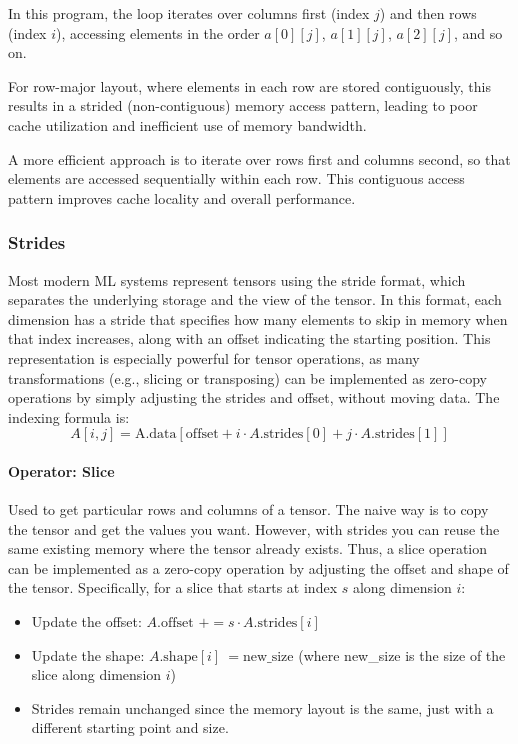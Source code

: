 \documentclass[twoside]{article}
\begin{document}
In this program, the loop iterates over columns first (index $j$) and then rows (index $i$), accessing elements in the order $a[0][j]$, $a[1][j]$, $a[2][j]$, and so on.

For row-major layout, where elements in each row are stored contiguously, this results in a strided (non-contiguous) memory access pattern, leading to poor cache utilization and inefficient use of memory bandwidth.

A more efficient approach is to iterate over rows first and columns second, so that elements are accessed sequentially within each row. This contiguous access pattern improves cache locality and overall performance.

\subsubsection{Strides}
Most modern ML systems represent tensors using the stride format, which separates the underlying storage and the view of the tensor. In this format, each dimension has a stride that specifies how many elements to skip in memory when that index increases, along with an offset indicating the starting position. This representation is especially powerful for tensor operations, as many transformations (e.g., slicing or transposing) can be implemented as zero-copy operations by simply adjusting the strides and offset, without moving data. The indexing formula is:
$$A[i, j] = \text{A.data}[\text{offset} + i \cdot A.\text{strides}[0] + j \cdot A.\text{strides}[1]]$$

\paragraph{Operator: Slice}
Used to get particular rows and columns of a tensor. The naive way is to copy 
the tensor and get the values you want. However, with strides you can reuse the 
same existing memory where the tensor already exists. Thus, a slice operation 
can be implemented as a zero-copy operation by adjusting the offset and shape 
of the tensor. Specifically, for a slice that starts at index $s$ along dimension $i$:
\begin{itemize}
    \item Update the offset: $A.\text{offset } += s \cdot A.\text{strides}[i]$
    \item Update the shape: $A.\text{shape}[i]\ = \text{new\_size}$ (where new\_size is the size of the slice along dimension $i$)
    \item Strides remain unchanged since the memory layout is the same, just with a different starting point and size.
\end{itemize}
\end{document}
